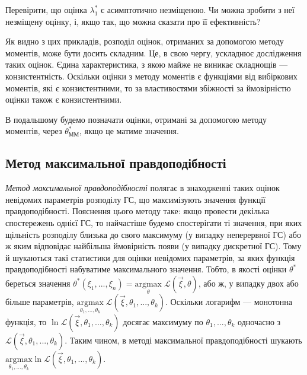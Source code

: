 \begin{exercise}
    Перевірити, що оцінка $\lambda_1^*$ є асимптотично незміщеною. Чи можна зробити з неї незміщену оцінку, і, якщо так, що можна сказати про її ефективність?
\end{exercise}
Як видно з цих прикладів, розподіл оцінок, отриманих за допомогою методу моментів, може бути досить складним. Це, в свою чергу, ускладнює дослідження таких оцінок.
Єдина характеристика, з якою майже не виникає складнощів --- конзистентність. Оскільки оцінки з методу моментів є функціями від вибіркових моментів, які є
конзистентними, то за властивостями збіжності за ймовірністю оцінки також є конзистентними.
\begin{remark}
    В подальшому будемо позначати оцінки, отримані за допомогою методу моментів, через $\theta^*_{\text{ММ}}$, якщо це матиме значення.
\end{remark}
\subsection{Метод максимальної правдоподібності}
\emph{Метод максимальної правдоподібності} полягає в знаходженні таких оцінок невідомих параметрів розподілу ГС, що максимізують значення функції правдоподібності.
Пояснення цього методу таке: якщо провести декілька спостережень однієї ГС, то найчастіше будемо спостерігати ті значення, при яких щільність розподілу близька до свого максимуму
(у випадку неперервної ГС) або ж яким відповідає найбільша ймовірність появи (у випадку дискретної ГС). Тому й шукаються такі статистики для оцінки невідомих параметрів, 
за яких функція правдоподібності набуватиме максимального значення.
Тобто, в якості оцінки $\theta^*$ береться значення $\theta^*(\xi_1, ..., \xi_n) = \underset{\theta}{\mathrm{argmax}} \;{\mathcal{L}(\vec{\xi}, \theta)}$, або ж, у випадку
двох або більше параметрів, $\underset{\theta_1, ..., \theta_k}{\mathrm{argmax}} \; {\mathcal{L}(\vec{\xi}, \theta_1, ..., \theta_k)}$. Оскільки логарифм --- монотонна функція,
то $\ln {\mathcal{L}(\vec{\xi}, \theta_1, ..., \theta_k)}$ досягає максимуму по $\theta_1, ..., \theta_k$ одночасно з ${\mathcal{L}(\vec{\xi}, \theta_1, ..., \theta_k)}$.
Таким чином, в методі максимальної правдоподібності шукають $\underset{\theta_1, ..., \theta_k}{\mathrm{argmax}} \ln{\mathcal{L}(\vec{\xi}, \theta_1, ..., \theta_k)}$.

